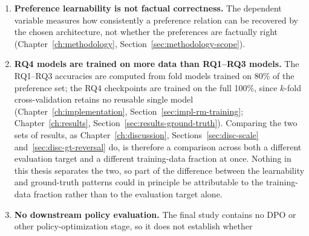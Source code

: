 \begin{enumerate}
    still prefer over a uniformly mediocre but non-fabricating alternative
    (Chapter~\ref{ch:introduction}, Section~\ref{sec:intro-motivation}). The
    locked configuration, however, is the simple mean ($\alpha=0.0$), and a
    mean dilutes a single low-scoring sentence in exactly the way a holistic
    judgment does; Figure~\ref{fig:gca-worked}
    (Chapter~\ref{ch:methodology}, Section~\ref{sec:methodology-design})
    shows this directly, with the weakest-link penalty formula, not the
    locked mean, producing the sentence-level sensitivity the motivating
    example calls for. That penalty formula was tested and rejected for
    performing worse overall (Chapter~\ref{ch:results},
    Section~\ref{sec:results-formula-opt}). What this thesis's confirmed
    result actually establishes, then, is that GCA's benefit at $n=1{,}000$
    comes from scoring sentences independently and averaging the result, not
    from penalizing the weakest one; the fabrication-masking scenario that
    motivated the project in the first place remains unresolved by the
    configuration that was found to work best.
  \item \textbf{Preference learnability is not factual correctness.} The
    dependent variable measures how consistently a preference relation can be
    recovered by the chosen architecture, not whether the preferences are
    factually right (Chapter~\ref{ch:methodology},
    Section~\ref{sec:methodology-scope}).
  \item \textbf{RQ4 models are trained on more data than RQ1--RQ3 models.}
    The RQ1--RQ3 accuracies are computed from fold models trained on 80\% of
    the preference set; the RQ4 checkpoints are trained on the full 100\%,
    since $k$-fold cross-validation retains no reusable single model
    (Chapter~\ref{ch:implementation}, Section~\ref{sec:impl-rm-training};
    Chapter~\ref{ch:results}, Section~\ref{sec:results-ground-truth}).
    Comparing the two sets of results, as Chapter~\ref{ch:discussion},
    Sections~\ref{sec:disc-scale} and~\ref{sec:disc-gt-reversal} do, is
    therefore a comparison across both a different evaluation target and a
    different training-data fraction at once. Nothing in this thesis
    separates the two, so part of the difference between the learnability
    and ground-truth patterns could in principle be attributable to the
    training-data fraction rather than to the evaluation target alone.
  \item \textbf{No downstream policy evaluation.} The final study contains no
    DPO or other policy-optimization stage, so it does not establish whether

\end{enumerate}

